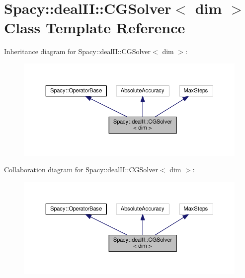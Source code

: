 \hypertarget{classSpacy_1_1dealII_1_1CGSolver}{\section{Spacy\-:\-:deal\-I\-I\-:\-:C\-G\-Solver$<$ dim $>$ Class Template Reference}
\label{classSpacy_1_1dealII_1_1CGSolver}
}


Inheritance diagram for Spacy\-:\-:deal\-I\-I\-:\-:C\-G\-Solver$<$ dim $>$\-:
\nopagebreak
\begin{figure}[H]
\begin{center}
\leavevmode
\includegraphics[width=350pt]{classSpacy_1_1dealII_1_1CGSolver__inherit__graph}
\end{center}
\end{figure}


Collaboration diagram for Spacy\-:\-:deal\-I\-I\-:\-:C\-G\-Solver$<$ dim $>$\-:
\nopagebreak
\begin{figure}[H]
\begin{center}
\leavevmode
\includegraphics[width=350pt]{classSpacy_1_1dealII_1_1CGSolver__coll__graph}
\end{center}
\end{figure}
